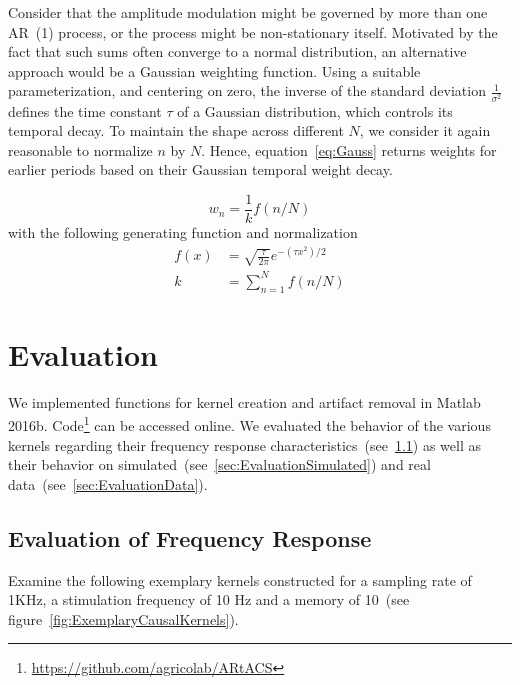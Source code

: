 \documentclass[a4paper]{article}
\newcommand{\figref}[1]{(see figure~\ref{#1})}
\begin{document}
Consider that the amplitude modulation might be governed by more than one AR~(1) process, or the process might be non-stationary itself.
Motivated by the fact that such sums  often converge to a normal distribution, an alternative approach would be a Gaussian weighting function.
Using a suitable parameterization, and centering on zero, the inverse of the standard deviation $\frac{1}{\sigma^2}$ defines the time constant $\tau$ of a Gaussian distribution, which controls its temporal decay.
To maintain the shape across different $N$, we consider it again reasonable to normalize $n$ by $N$. Hence, equation~\eqref{eq:Gauss} returns weights for earlier periods based on their Gaussian temporal weight decay.

\begin{equation}
    w_n = \frac{1}{k} f(n/N)\label{eq:Gauss}
\end{equation}
with the following generating function and normalization
\begin{align}
    f(x)  & = \sqrt{\frac{\tau}{2\pi}} e^{-(\tau x^2)/2}  \\
    k  & = \sum_{n=1}^{N} f(n/N)\label{eq:NormGauss}
\end{align}


\section{Evaluation}

We implemented functions for kernel creation and artifact removal in Matlab 2016b. Code\footnote{\url{https://github.com/agricolab/ARtACS}}  can be accessed online. We evaluated the behavior of the various kernels regarding their frequency response characteristics~(see~\ref{sec:EvaluationFreq}) as well as their behavior on simulated~(see~\ref{sec:EvaluationSimulated})  and real data~(see~\ref{sec:EvaluationData}).

\subsection{Evaluation of Frequency Response}\label{sec:EvaluationFreq}

Examine the following exemplary kernels constructed for a sampling rate of 1KHz, a stimulation frequency of 10 Hz and a memory of 10~\figref{fig:ExemplaryCausalKernels}.
\end{document}
